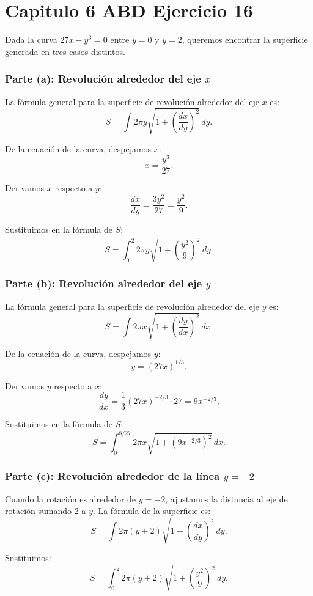 \chapter*{Capitulo 6 ABD Ejercicio 16}

Dada la curva \( 27x - y^3 = 0 \) entre \( y = 0 \) y \( y = 2 \), queremos encontrar la superficie generada en tres casos distintos.

\subsection*{Parte (a): Revolución alrededor del eje \( x \)}

La fórmula general para la superficie de revolución alrededor del eje \( x \) es:
\[
S = \int 2\pi y \sqrt{1 + \left( \frac{dx}{dy} \right)^2} \, dy.
\]

De la ecuación de la curva, despejamos \( x \):
\[
x = \frac{y^3}{27}.
\]

Derivamos \( x \) respecto a \( y \):
\[
\frac{dx}{dy} = \frac{3y^2}{27} = \frac{y^2}{9}.
\]

Sustituimos en la fórmula de \( S \):
\[
S = \int_{0}^{2} 2\pi y \sqrt{1 + \left( \frac{y^2}{9} \right)^2} \, dy.
\]

\subsection*{Parte (b): Revolución alrededor del eje \( y \)}

La fórmula general para la superficie de revolución alrededor del eje \( y \) es:
\[
S = \int 2\pi x \sqrt{1 + \left( \frac{dy}{dx} \right)^2} \, dx.
\]

De la ecuación de la curva, despejamos \( y \):
\[
y = (27x)^{1/3}.
\]

Derivamos \( y \) respecto a \( x \):
\[
\frac{dy}{dx} = \frac{1}{3} (27x)^{-2/3} \cdot 27 = 9x^{-2/3}.
\]

Sustituimos en la fórmula de \( S \):
\[
S = \int_{0}^{8/27} 2\pi x \sqrt{1 + \left( 9x^{-2/3} \right)^2} \, dx.
\]

\subsection*{Parte (c): Revolución alrededor de la línea \( y = -2 \)}

Cuando la rotación es alrededor de \( y = -2 \), ajustamos la distancia al eje de rotación sumando 2 a \( y \). La fórmula de la superficie es:
\[
S = \int 2\pi (y + 2) \sqrt{1 + \left( \frac{dx}{dy} \right)^2} \, dy.
\]

Sustituimos:
\[
S = \int_{0}^{2} 2\pi (y + 2) \sqrt{1 + \left( \frac{y^2}{9} \right)^2} \, dy.
\]
